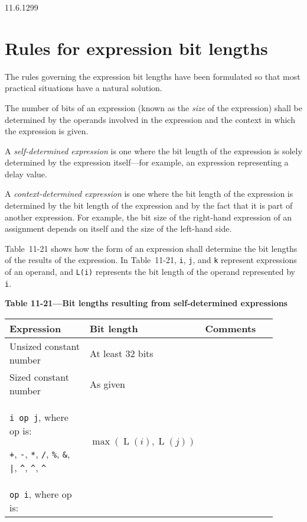 \documentclass{article}
\newcommand{\del}{\color{darkred}}
\DeclareMathOperator{\Size}{L}
\newcommand{\tild}{\raisebox{-.7ex}{\textasciitilde{}}}
\newcommand{\binOp}{\texttt{+}, \texttt{-}, \texttt{*}, \texttt{/}, \texttt{\%},
\texttt{\&}, \texttt{|}, \texttt{\^{}}, \texttt{\^{}\tild},
\texttt{\tild\^{}}}
\begin{document}
\begin{lrmquote}{11.6.1}{299}
  \section{Rules for expression bit lengths}
  \label{expression-bit-widths}

  {
    \del{}

    The rules governing the expression bit lengths have been formulated so that most
    practical situations have a natural solution.

    The number of bits of an expression (known as the \emph{size} of the
    expression) shall be determined by the operands involved in the expression and
    the context in which the expression is given.

    A \emph{self-determined expression} is one where the bit length of the expression is
    solely determined by the expression itself—for example, an expression
    representing a delay value.

    A \emph{context-determined expression} is one where the bit length of the expression is
    determined by the bit length of the expression and by the fact that it is part
    of another expression. For example, the bit size of the right-hand expression of
    an assignment depends on itself and the size of the left-hand side.

    Table~11-21 shows how the form of an expression shall determine the bit lengths
    of the results of the expression. In Table~11-21, \texttt{i}, \texttt{j}, and
    \texttt{k} represent expressions of an operand, and \texttt{L(i)} represents the
    bit length of the operand represented by \texttt{i}.

    \begin{center}
      \textbf{Table 11-21---Bit lengths resulting from self-determined expressions}
      \begin{longtable}{|p{0.35\linewidth}|C{0.25\linewidth}|C{0.3\linewidth}|}
        \hline
        \centering \textbf{Expression}
         & \textbf{Bit length}
         & \textbf{Comments}
        \\
        \hline
        Unsized constant number
         & At least 32 bits
         &
        \\
        \hline
        Sized constant number
         & As given
         &
        \\
        \hline
        \verb|i op j|, where op is:

        \binOp{}
         & $\max\left(\Size(i), \Size(j)\right)$
         &
        \\
        \hline
        \verb|op i|, where op is:


\end{longtable}
\end{center}}
\end{lrmquote}
\end{document}
